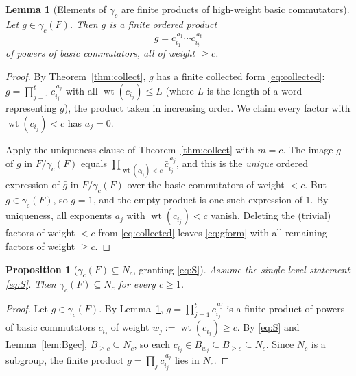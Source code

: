 \documentclass{amsart}
\newtheorem{lemma}{Lemma}
\newtheorem{proposition}{Proposition}
\theoremstyle{definition}
\theoremstyle{remark}
\begin{document}
\begin{lemma}[Elements of $\gamma_c$ are finite products of high-weight basic commutators]\label{lem:finite-form}
Let $g\in\gamma_c(F)$. Then $g$ is a finite ordered product
\begin{equation}\label{eq:gform}
g=c_{i_1}^{\,a_1}\cdots c_{i_t}^{\,a_t}
\end{equation}
of powers of basic commutators, all of weight $\ge c$.
\end{lemma}
\begin{proof}
By Theorem~\ref{thm:collect}, $g$ has a finite collected form
\eqref{eq:collected}: $g=\prod_{j=1}^{t}c_{i_j}^{\,a_j}$ with all
$\operatorname{wt}(c_{i_j})\le L$ (where $L$ is the length of a word representing
$g$), the product taken in increasing order. We claim every factor with
$\operatorname{wt}(c_{i_j})<c$ has $a_j=0$.

Apply the uniqueness clause of Theorem~\ref{thm:collect} with $m=c$. The image
$\bar g$ of $g$ in $F/\gamma_c(F)$ equals
$\prod_{\operatorname{wt}(c_{i_j})<c}\bar c_{i_j}^{\,a_j}$, and this is the
\emph{unique} ordered expression of $\bar g$ in $F/\gamma_c(F)$ over the basic
commutators of weight $<c$. But $g\in\gamma_c(F)$, so $\bar g=1$, and the empty
product is one such expression of $1$. By uniqueness, all exponents $a_j$ with
$\operatorname{wt}(c_{i_j})<c$ vanish. Deleting the (trivial) factors of weight
$<c$ from \eqref{eq:collected} leaves \eqref{eq:gform} with all remaining factors
of weight $\ge c$.
\end{proof}

\begin{proposition}[$\gamma_c(F)\subseteq N_c$, granting \eqref{eq:S}]\label{prop:gamma-in-N}
Assume the single-level statement \eqref{eq:S}. Then $\gamma_c(F)\subseteq N_c$ for
every $c\ge1$.
\end{proposition}
\begin{proof}
Let $g\in\gamma_c(F)$. By Lemma~\ref{lem:finite-form}, $g=\prod_{j=1}^{t}
c_{i_j}^{\,a_j}$ is a finite product of powers of basic commutators
$c_{i_j}$ of weight $w_j:=\operatorname{wt}(c_{i_j})\ge c$. By \eqref{eq:S} and
Lemma~\ref{lem:Bgec}, $B_{\ge c}\subseteq N_c$, so each $c_{i_j}\in B_{w_j}\subseteq
B_{\ge c}\subseteq N_c$. Since $N_c$ is a subgroup, the finite product
$g=\prod_j c_{i_j}^{\,a_j}$ lies in $N_c$.
\end{proof}
\end{document}
